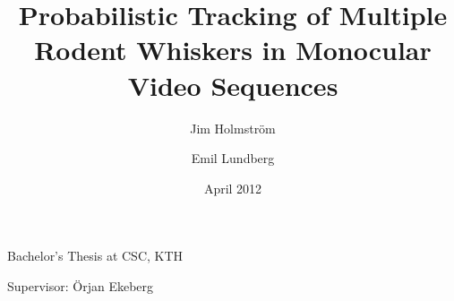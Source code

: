 \documentclass[a4paper,11pt]{article}
\title{
    Probabilistic Tracking of Multiple Rodent Whiskers in Monocular Video Sequences
}
\author{
    Jim Holmström\and
    Emil Lundberg
}
\date{April 2012}
\begin{document}
\maketitle
{}
Bachelor's Thesis at CSC, KTH

Supervisor: Örjan Ekeberg
\begin{abstract}
  
\end{abstract}
\end{document}

